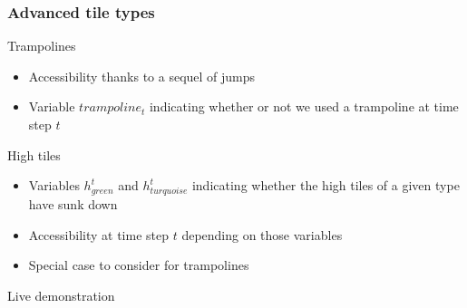 \begin{frame}
	\frametitle{Advanced tile types}
	\begin{block}{Trampolines}
		\begin{itemize}
			\item Accessibility thanks to a sequel of jumps
			\pause
			\item Variable $trampoline_t$ indicating whether or not we used
				  a trampoline at time step $t$
		\end{itemize}
	\end{block}

	\pause

	\begin{block}{High tiles}
		\begin{itemize}
			\item Variables $h_{green}^t$ and $h_{turquoise}^t$ indicating
				  whether the high tiles of a given type have sunk down
			\pause
			\item Accessibility at time step $t$ depending on those
				  variables
			\pause
			\item Special case to consider for trampolines
		\end{itemize}
	\end{block}
\end{frame}

\begin{frame}
	\centering
	\hfill \Large Live demonstration \hfill\hfill
\end{frame}
